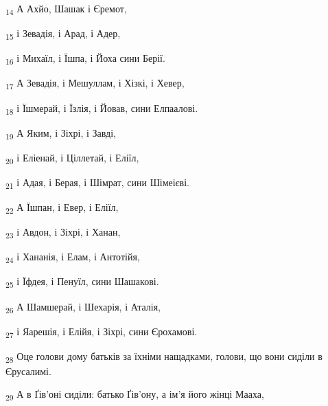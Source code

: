 \begin{tcolorbox}
\textsubscript{14} А Ахйо, Шашак і Єремот,
\end{tcolorbox}
\begin{tcolorbox}
\textsubscript{15} і Зевадія, і Арад, і Адер,
\end{tcolorbox}
\begin{tcolorbox}
\textsubscript{16} і Михаїл, і Їшпа, і Йоха сини Берії.
\end{tcolorbox}
\begin{tcolorbox}
\textsubscript{17} А Зевадія, і Мешуллам, і Хізкі, і Хевер,
\end{tcolorbox}
\begin{tcolorbox}
\textsubscript{18} і Їшмерай, і Їзлія, і Йовав, сини Елпаалові.
\end{tcolorbox}
\begin{tcolorbox}
\textsubscript{19} А Яким, і Зіхрі, і Завді,
\end{tcolorbox}
\begin{tcolorbox}
\textsubscript{20} і Еліенай, і Ціллетай, і Еліїл,
\end{tcolorbox}
\begin{tcolorbox}
\textsubscript{21} і Адая, і Берая, і Шімрат, сини Шімеієві.
\end{tcolorbox}
\begin{tcolorbox}
\textsubscript{22} А Їшпан, і Евер, і Еліїл,
\end{tcolorbox}
\begin{tcolorbox}
\textsubscript{23} і Авдон, і Зіхрі, і Ханан,
\end{tcolorbox}
\begin{tcolorbox}
\textsubscript{24} і Хананія, і Елам, і Антотійя,
\end{tcolorbox}
\begin{tcolorbox}
\textsubscript{25} і Їфдея, і Пенуїл, сини Шашакові.
\end{tcolorbox}
\begin{tcolorbox}
\textsubscript{26} А Шамшерай, і Шехарія, і Аталія,
\end{tcolorbox}
\begin{tcolorbox}
\textsubscript{27} і Яарешія, і Елійя, і Зіхрі, сини Єрохамові.
\end{tcolorbox}
\begin{tcolorbox}
\textsubscript{28} Оце голови дому батьків за їхніми нащадками, голови, що вони сиділи в Єрусалимі.
\end{tcolorbox}
\begin{tcolorbox}
\textsubscript{29} А в Ґів'оні сиділи: батько Ґів'ону, а ім'я його жінці Мааха,
\end{tcolorbox}
